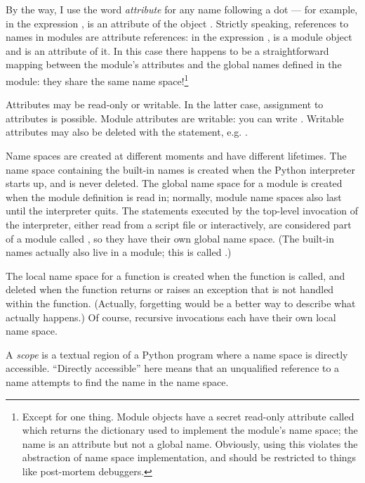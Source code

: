 \documentclass{manual}
\begin{document}
By the way, I use the word \emph{attribute} for any name following a
dot --- for example, in the expression ,  is
an attribute of the object .  Strictly speaking, references to
names in modules are attribute references: in the expression
,  is a module object and
 is an attribute of it.  In this case there happens to
be a straightforward mapping between the module's attributes and the
global names defined in the module: they share the same name
space!\footnote{
        Except for one thing.  Module objects have a secret read-only
        attribute called  which returns the dictionary
        used to implement the module's name space; the name
         is an attribute but not a global name.
        Obviously, using this violates the abstraction of name space
        implementation, and should be restricted to things like
        post-mortem debuggers.
}

Attributes may be read-only or writable.  In the latter case,
assignment to attributes is possible.  Module attributes are writable:
you can write .  Writable attributes may
also be deleted with the  statement, e.g.
.

Name spaces are created at different moments and have different
lifetimes.  The name space containing the built-in names is created
when the Python interpreter starts up, and is never deleted.  The
global name space for a module is created when the module definition
is read in; normally, module name spaces also last until the
interpreter quits.  The statements executed by the top-level
invocation of the interpreter, either read from a script file or
interactively, are considered part of a module called
, so they have their own global name space.  (The
built-in names actually also live in a module; this is called
.)

The local name space for a function is created when the function is
called, and deleted when the function returns or raises an exception
that is not handled within the function.  (Actually, forgetting would
be a better way to describe what actually happens.)  Of course,
recursive invocations each have their own local name space.

A \emph{scope} is a textual region of a Python program where a name space
is directly accessible.  ``Directly accessible'' here means that an
unqualified reference to a name attempts to find the name in the name
space.
\end{document}

